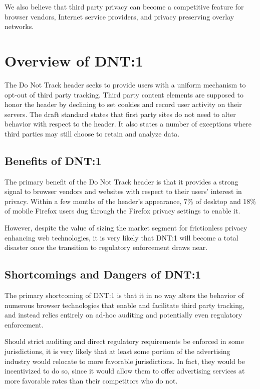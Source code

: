 \documentclass[letterpaper,11pt]{llncs}
\begin{document}
We also believe that third party privacy can become a competitive feature for
browser vendors, Internet service providers, and privacy preserving overlay
networks.

\section{Overview of DNT:1}

The Do Not Track header seeks to provide users with a uniform mechanism to
opt-out of third party tracking. Third party content elements are supposed to
honor the header by declining to set cookies and record user activity on their
servers. The draft standard\cite{DNT-draft} states that first party sites do
not need to alter behavior with respect to the header. It also states a number
of exceptions where third parties may still choose to retain and analyze data.

\subsection{Benefits of DNT:1}

The primary benefit of the Do Not Track header is that it provides a strong
signal to browser vendors and websites with respect to their users'
interest in privacy. Within a few months of the header's appearance, 7\% of
desktop and 18\% of mobile Firefox users dug through the Firefox privacy
settings to enable it.\cite{DNT-adoption}

However, despite the value of sizing the market segment for frictionless
privacy enhancing web technologies, it is very likely that DNT:1 will become a
total disaster once the transition to regulatory enforcement draws near.

\subsection{Shortcomings and Dangers of DNT:1}

The primary shortcoming of DNT:1 is that it in no way alters the behavior of
numerous browser technologies that enable and facilitate third party tracking,
and instead relies entirely on ad-hoc auditing and potentially even regulatory
enforcement.

Should strict auditing and direct regulatory requirements be enforced in some
jurisdictions, it is very likely that at least some portion of the advertising
industry would relocate to more favorable jurisdictions. In fact, they would
be incentivized to do so, since it would allow them to offer advertising
services at more favorable rates than their competitors who do not.
\end{document}
